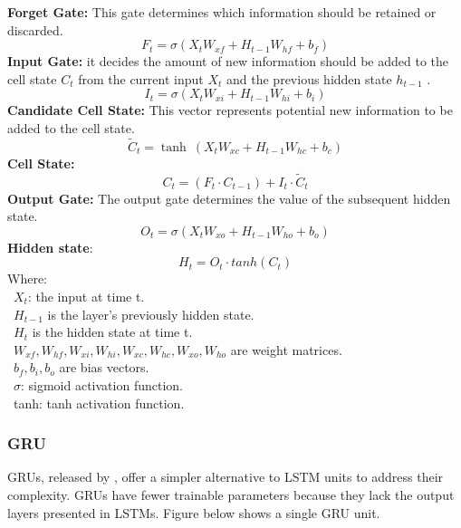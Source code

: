 \documentclass{ieeeojies}
\begin{document}
\textbf{Forget Gate:} This gate determines which information should be retained or discarded.
\[F_t = \sigma(X_tW_{xf} + H_{t-1}W_{hf}+ b_f)\]
\textbf{Input Gate:} it decides the amount of new information should be added to the cell state \(C_t\) from the current input \(X_t\) and the previous hidden state \(h_{t-1}\) .
\[I_t = \sigma(X_tW_{xi} + H_{t-1}W_{hi}+ b_i)\]
\textbf{Candidate Cell State:} This vector represents potential new information to be added to the cell state.
\[\widetilde{C}_t = \tanh\ (X_t W_{xc} + H_{t-1} W_{hc} + b_c)\]
\textbf{Cell State:}\[C_t = (F_t\cdot C_{t-1}) + I_{t}\cdot\widetilde{C}_t\]
\textbf{Output Gate:} The output gate determines the value of the subsequent hidden state.	
\[O_t = \sigma(X_tW_{xo} + H_{t-1}W_{ho}+ b_o)\]
\textbf{Hidden state}:\[H_t = O_t\cdot tanh({C}_t)\]
Where:\\
	\indent\textbullet\ \(X_t\): the input at time t.\\
        \indent\textbullet\ \(H_{t-1}\) is the layer's previously hidden state.\\
        \indent\textbullet\ \(H_t\) is the hidden state at time t.\\
	\indent\textbullet\ \(W_{xf}, W_{hf}, W_{xi},W_{hi}, W_{xc}, W_{hc}, W_{xo}, W_{ho}\) are weight matrices.\\
	\indent\textbullet\ \(b_f, b_i, b_o\) are bias vectors.\\
	\indent\textbullet\ \(\sigma\): sigmoid activation function.\\
        \indent\textbullet\ tanh: tanh activation function.\\

\subsubsection{GRU}
GRUs, released by \cite{model_Gru}, offer a simpler alternative to LSTM units to address their complexity. GRUs have fewer trainable parameters because they lack the output layers presented in LSTMs. Figure below shows a single GRU unit.
\end{document}

